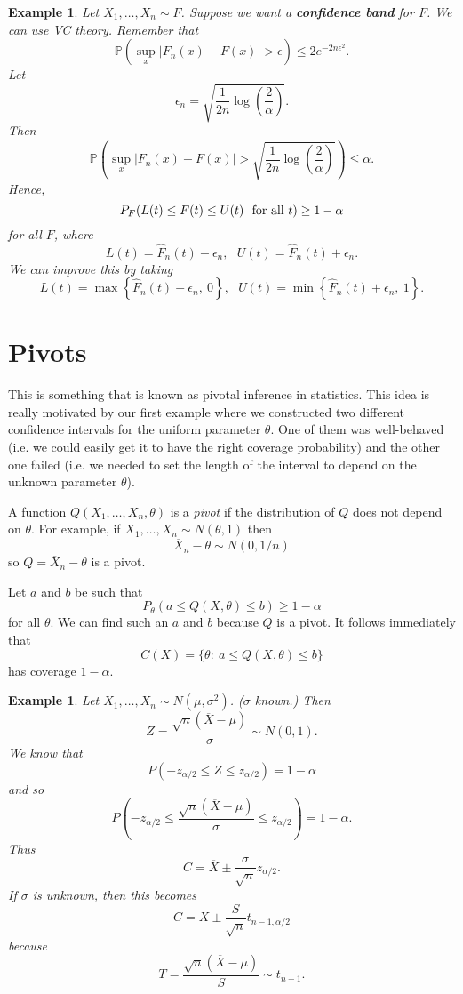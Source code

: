 \documentclass[twoside,12pt]{article}
\newtheorem{example}[theorem]{Example}
\begin{document}
\begin{example}
Let $X_1,\ldots, X_n \sim F$.
Suppose we want a 
{\bf confidence band} for $F$.
We can use VC theory.
Remember that
$$
\mathbb{P}\left(\sup_x | F_n(x) - F(x)| > \epsilon\right)\leq 2 e^{- 2n\epsilon^2}.
$$
Let
$$
\epsilon_n = \sqrt{\frac{1}{2n}\log\left(\frac{2}{\alpha}\right)}.
$$
Then
$$
\mathbb{P}\left(\sup_x | F_n(x) - F(x)| > \sqrt{\frac{1}{2n}\log\left(\frac{2}{\alpha}\right)}\right)\leq \alpha.
$$
Hence,
$$
P_F(L(t) \leq F(t)\leq U(t)\ \ {\rm for\ all\ }t) \geq 1-\alpha
$$
for all $F$, where
$$
L(t) = \widehat{F}_n(t) -\epsilon_n,\ \ \ 
U(t) = \widehat{F}_n(t) +\epsilon_n.
$$
We can improve this by taking
$$
L(t) = \max\left\{\widehat{F}_n(t) -\epsilon_n,\ 0\right\},\ \ \ 
U(t) = \min\left\{\widehat{F}_n(t) +\epsilon_n,\ 1\right\}.
$$
\end{example}

\section{Pivots}
This is something that is known as pivotal inference in statistics. This idea is really motivated by our first example where we constructed two different confidence intervals for the uniform parameter $\theta$. One of them was well-behaved (i.e. we could easily get it to have the right coverage probability) and the other one failed (i.e. we needed to set the length of the interval to depend on the unknown parameter $\theta$). 


A function
$Q(X_1,\ldots,X_n,\theta)$
is a {\em pivot} if the distribution of $Q$ does not depend on $\theta$.
For example, if
$X_1,\ldots, X_n \sim N(\theta,1)$ then
$$
\overline{X}_n-\theta \sim N(0,1/n)
$$
so
$Q=\overline{X}_n-\theta$ is a pivot.

Let $a$ and $b$ be such that
$$
P_\theta(a \leq Q(X,\theta)\leq b) \geq 1-\alpha
$$
for all $\theta$.
We can find such an $a$ and $b$ because
$Q$ is a pivot.
It follows immediately that
$$
C(X) = \{\theta:\ a \leq Q(X,\theta)\leq b\}
$$
has coverage $1-\alpha$.

\begin{example}
Let $X_1,\ldots, X_n\sim N(\mu,\sigma^2)$.
($\sigma$ known.)
Then
$$
Z = \frac{\sqrt{n}(\overline{X}-\mu)}{\sigma} \sim N(0,1).
$$
We know that
$$
P(-z_{\alpha/2}\leq Z \leq z_{\alpha/2}) = 1-\alpha
$$
and so
$$
P\left(-z_{\alpha/2}\leq \frac{\sqrt{n}(\overline{X}-\mu)}{\sigma} \leq z_{\alpha/2}\right) = 1-\alpha.
$$
Thus
$$
C = \overline{X} \pm \frac{\sigma}{\sqrt{n}} z_{\alpha/2}.
$$
If $\sigma$ is unknown, then this becomes
$$
C = \overline{X} \pm \frac{S}{\sqrt{n}} t_{n-1,\alpha/2}
$$
because
$$
T = \frac{\sqrt{n}(\overline{X}-\mu)}{S} \sim t_{n-1}.
$$
\end{example}
\end{document}
